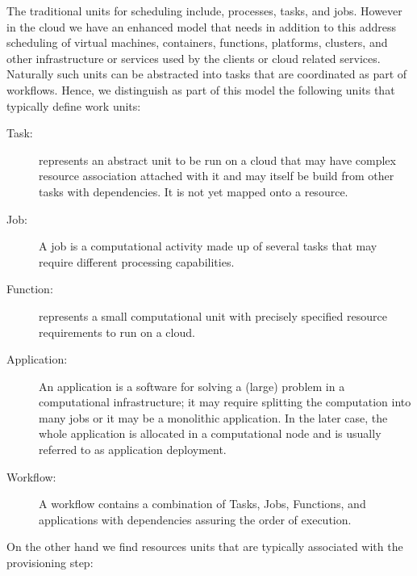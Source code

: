 \documentclass[final,5p,times,twocolumn]{elsarticle}
\begin{document}
\color{red}

The traditional units for scheduling include, processes, tasks, and
jobs. However in the cloud we have an enhanced model that needs in
addition to this address scheduling of virtual machines, containers,
functions, platforms, clusters, and other infrastructure or services
used by the clients or cloud related services. Naturally such units
can be abstracted into tasks that are coordinated as part of
workflows. Hence, we distinguish as part of this model the following
units that typically define work units:

\begin{description}

\item[Task:] represents an abstract unit to be run on a cloud that may
  have complex resource association attached with it and may itself be
  build from other tasks with dependencies. It is not yet mapped onto
  a resource.

\item[Job:] A job is a computational activity made up of several tasks
  that may require different processing capabilities.

\item[Function:] represents a small computational unit with precisely
  specified resource requirements to run on a cloud.

\item[Application:] An application is a software for solving a (large)
  problem in a computational infrastructure; it may require splitting
  the computation into many jobs or it may be a monolithic
  application. In the later case, the whole application is allocated
  in a computational node and is usually referred to as application
  deployment.

\item[Workflow:] A workflow contains a combination of Tasks, Jobs,
Functions, and applications with dependencies assuring the order of
execution.

\end{description}

On the other hand we find resources units that are typically
associated with the provisioning step:
\end{document}
